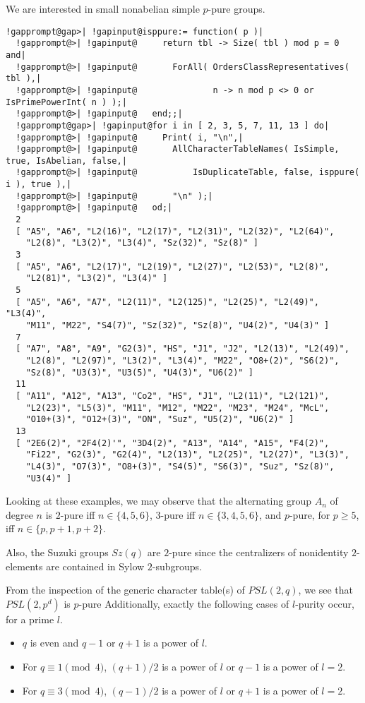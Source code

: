 \documentclass[a4paper,11pt]{report}
\begin{document}
{{{ We are interested in small nonabelian simple $p$-pure groups. 

 
\begin{Verbatim}[commandchars=!@|,fontsize=\small,frame=single,label=Example]
  !gapprompt@gap>| !gapinput@isppure:= function( p )|
  !gapprompt@>| !gapinput@     return tbl -> Size( tbl ) mod p = 0 and|
  !gapprompt@>| !gapinput@       ForAll( OrdersClassRepresentatives( tbl ),|
  !gapprompt@>| !gapinput@               n -> n mod p <> 0 or IsPrimePowerInt( n ) );|
  !gapprompt@>| !gapinput@   end;;|
  !gapprompt@gap>| !gapinput@for i in [ 2, 3, 5, 7, 11, 13 ] do|
  !gapprompt@>| !gapinput@     Print( i, "\n",|
  !gapprompt@>| !gapinput@       AllCharacterTableNames( IsSimple, true, IsAbelian, false,|
  !gapprompt@>| !gapinput@           IsDuplicateTable, false, isppure( i ), true ),|
  !gapprompt@>| !gapinput@       "\n" );|
  !gapprompt@>| !gapinput@   od;|
  2
  [ "A5", "A6", "L2(16)", "L2(17)", "L2(31)", "L2(32)", "L2(64)", 
    "L2(8)", "L3(2)", "L3(4)", "Sz(32)", "Sz(8)" ]
  3
  [ "A5", "A6", "L2(17)", "L2(19)", "L2(27)", "L2(53)", "L2(8)", 
    "L2(81)", "L3(2)", "L3(4)" ]
  5
  [ "A5", "A6", "A7", "L2(11)", "L2(125)", "L2(25)", "L2(49)", "L3(4)", 
    "M11", "M22", "S4(7)", "Sz(32)", "Sz(8)", "U4(2)", "U4(3)" ]
  7
  [ "A7", "A8", "A9", "G2(3)", "HS", "J1", "J2", "L2(13)", "L2(49)", 
    "L2(8)", "L2(97)", "L3(2)", "L3(4)", "M22", "O8+(2)", "S6(2)", 
    "Sz(8)", "U3(3)", "U3(5)", "U4(3)", "U6(2)" ]
  11
  [ "A11", "A12", "A13", "Co2", "HS", "J1", "L2(11)", "L2(121)", 
    "L2(23)", "L5(3)", "M11", "M12", "M22", "M23", "M24", "McL", 
    "O10+(3)", "O12+(3)", "ON", "Suz", "U5(2)", "U6(2)" ]
  13
  [ "2E6(2)", "2F4(2)'", "3D4(2)", "A13", "A14", "A15", "F4(2)", 
    "Fi22", "G2(3)", "G2(4)", "L2(13)", "L2(25)", "L2(27)", "L3(3)", 
    "L4(3)", "O7(3)", "O8+(3)", "S4(5)", "S6(3)", "Suz", "Sz(8)", 
    "U3(4)" ]
\end{Verbatim}
 

 Looking at these examples, we may observe that the alternating group $A_n$ of degree $n$ is $2$-pure iff $n \in \{ 4, 5, 6 \}$, $3$-pure iff $n \in \{ 3, 4, 5, 6 \}$, and $p$-pure, for $p \geq 5$, iff $n \in \{ p, p+1, p+2 \}$. 

 Also, the Suzuki groups $Sz(q)$ are $2$-pure since the centralizers of nonidentity $2$-elements are contained in Sylow $2$-subgroups. 

 From the inspection of the generic character table(s) of $PSL(2, q)$, we see that $PSL(2, p^d)$ is $p$-pure Additionally, exactly the following cases of $l$-purity occur, for a prime $l$. 
\begin{itemize}
\item  $q$ is even and $q-1$ or $q+1$ is a power of $l$. 
\item  For $q \equiv 1 \pmod{4}$, $(q+1)/2$ is a power of $l$ or $q-1$ is a power of $l = 2$. 
\item  For $q \equiv 3 \pmod{4}$, $(q-1)/2$ is a power of $l$ or $q+1$ is a power of $l = 2$. 
\end{itemize}
  }

}}
\end{document}
